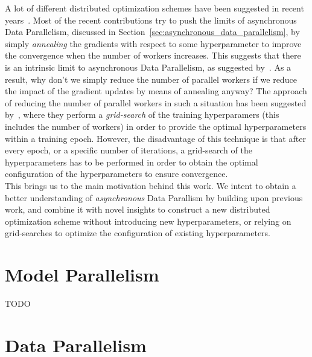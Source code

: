 A lot of different distributed optimization schemes have been suggested in recent years~\cite{zhang2015deep, dean2012large, hadjis2016omnivore}. Most of the recent contributions try to push the limits of asynchronous Data Parallelism, discussed in Section~\ref{sec:asynchronous_data_parallelism}, by simply \emph{annealing} the gradients with respect to some hyperparameter to improve the convergence when the number of workers increases. This suggests that there is an intrinsic limit to asynchronous Data Parallelism, as suggested by~\cite{implicitmomentum}. As a result, why don't we simply reduce the number of parallel workers if we reduce the impact of the gradient updates by means of annealing anyway? The approach of reducing the number of parallel workers in such a situation has been suggested by~\cite{hadjis2016omnivore}, where they perform a \emph{grid-search} of the training hyperparamers (this includes the number of workers) in order to provide the optimal hyperparameters within a training epoch. However, the disadvantage of this technique is that after every epoch, or a specific number of iterations, a grid-search of the hyperparameters has to be performed in order to obtain the optimal configuration of the hyperparameters to ensure convergence.\\

This brings us to the main motivation behind this work. We intent to obtain a better understanding of \emph{asynchronous} Data Parallism by building upon previous work, and combine it with novel insights to construct a new distributed optimization scheme without introducing new hyperparameters, or relying on grid-searches to optimize the configuration of existing hyperparameters.

\section{Model Parallelism}
\label{sec:intro_model_parallelism}

TODO

\section{Data Parallelism}
\label{sec:intro_data_parallelism}

